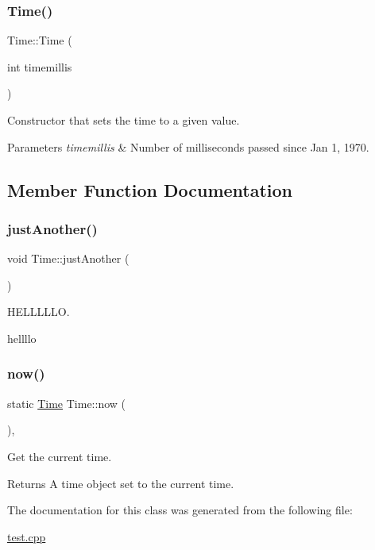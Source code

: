 \subsubsection{\texorpdfstring{Time()}{Time()}}
{\footnotesize\ttfamily Time\+::\+Time (\begin{DoxyParamCaption}\item[{int}]{timemillis }\end{DoxyParamCaption})\hspace{0.3cm}{\ttfamily [inline]}}

Constructor that sets the time to a given value.


\begin{DoxyParams}{Parameters}
{\em timemillis} & Number of milliseconds passed since Jan 1, 1970. \\
\hline
\end{DoxyParams}


\subsection{Member Function Documentation}
\mbox{\label{classTime_ae85f93efc2d77b0c02cf9cf5ef2621eb}} 
\subsubsection{\texorpdfstring{just\+Another()}{justAnother()}}
{\footnotesize\ttfamily void Time\+::just\+Another (\begin{DoxyParamCaption}{ }\end{DoxyParamCaption})\hspace{0.3cm}{\ttfamily [inline]}}



H\+E\+L\+L\+L\+L\+LO. 

hellllo \mbox{\label{classTime_a4e698154700835119a946be6071a0984}} 
\subsubsection{\texorpdfstring{now()}{now()}}
{\footnotesize\ttfamily static \hyperlink{classTime}{Time} Time\+::now (\begin{DoxyParamCaption}{ }\end{DoxyParamCaption})\hspace{0.3cm}{\ttfamily [inline]}, {\ttfamily [static]}}

Get the current time.

\begin{DoxyReturn}{Returns}
A time object set to the current time. 
\end{DoxyReturn}


The documentation for this class was generated from the following file\+:\begin{DoxyCompactItemize}
\item 
\hyperlink{test_8cpp}{test.\+cpp}\end{DoxyCompactItemize}
